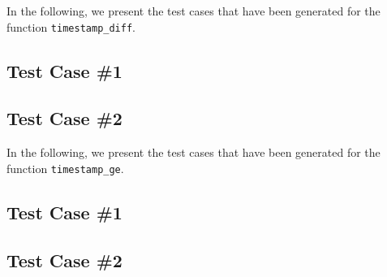 In the following, we present the test cases that have been generated for the function \texttt{timestamp\_diff}.

\subsection{Test Case \#1}


\subsection{Test Case \#2}




In the following, we present the test cases that have been generated for the function \texttt{timestamp\_ge}.

\subsection{Test Case \#1}


\subsection{Test Case \#2}



